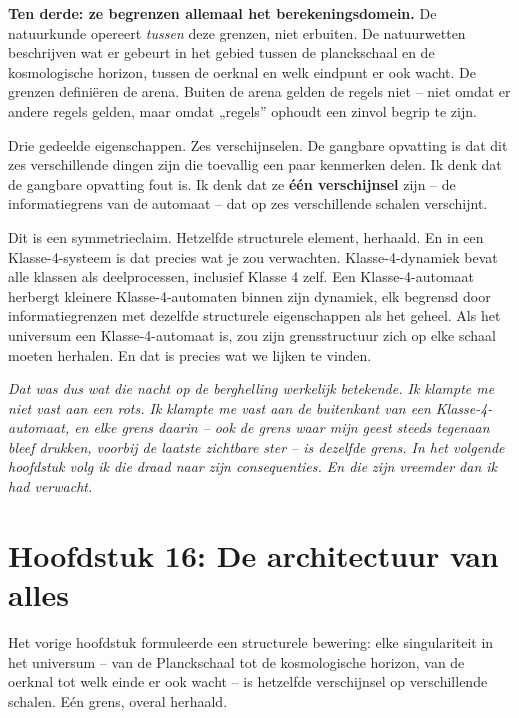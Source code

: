 \documentclass[11pt, twoside, openright]{book}
\begin{document}
\textbf{Ten derde: ze begrenzen allemaal het berekeningsdomein.} De natuurkunde opereert \textit{tussen} deze grenzen, niet erbuiten. De natuurwetten beschrijven wat er gebeurt in het gebied tussen de planckschaal en de kosmologische horizon, tussen de oerknal en welk eindpunt er ook wacht. De grenzen definiëren de arena. Buiten de arena gelden de regels niet -- niet omdat er andere regels gelden, maar omdat „regels” ophoudt een zinvol begrip te zijn.

Drie gedeelde eigenschappen. Zes verschijnselen. De gangbare opvatting is dat dit zes verschillende dingen zijn die toevallig een paar kenmerken delen. Ik denk dat de gangbare opvatting fout is. Ik denk dat ze \textbf{één verschijnsel} zijn -- de informatiegrens van de automaat -- dat op zes verschillende schalen verschijnt.

Dit is een symmetrieclaim. Hetzelfde structurele element, herhaald. En in een Klasse-4-systeem is dat precies wat je zou verwachten. Klasse-4-dynamiek bevat alle klassen als deelprocessen, inclusief Klasse 4 zelf. Een Klasse-4-automaat herbergt kleinere Klasse-4-automaten binnen zijn dynamiek, elk begrensd door informatiegrenzen met dezelfde structurele eigenschappen als het geheel. Als het universum een Klasse-4-automaat is, zou zijn grensstructuur zich op elke schaal moeten herhalen. En dat is precies wat we lijken te vinden.


\textit{Dat was dus wat die nacht op de berghelling werkelijk betekende. Ik klampte me niet vast aan een rots. Ik klampte me vast aan de buitenkant van een Klasse-4-automaat, en elke grens daarin -- ook de grens waar mijn geest steeds tegenaan bleef drukken, voorbij de laatste zichtbare ster -- is dezelfde grens. In het volgende hoofdstuk volg ik die draad naar zijn consequenties. En die zijn vreemder dan ik had verwacht.}


\chapter*{Hoofdstuk 16: De architectuur van alles}

Het vorige hoofdstuk formuleerde een structurele bewering: elke singulariteit in het universum -- van de Planckschaal tot de kosmologische horizon, van de oerknal tot welk einde er ook wacht -- is hetzelfde verschijnsel op verschillende schalen. Eén grens, overal herhaald.
\end{document}
